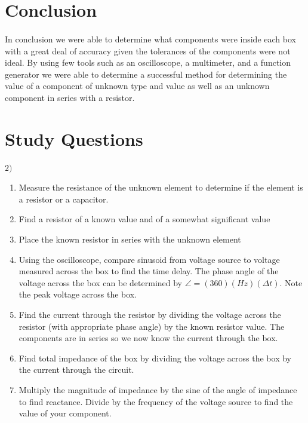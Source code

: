 \documentclass{article}
\begin{document}

\section*{Conclusion}
\paragraph{}
In conclusion we were able to determine what components were inside each box with
a great deal of accuracy given the tolerances of the components were not ideal. By
using few tools such as an oscilloscope, a multimeter, and a function generator we
were able to determine a successful method for determining the value of a component
of unknown type and value as well as an unknown component in series with a resistor.

\section*{Study Questions}

$2)$
\begin{enumerate}
\item Measure the resistance of the unknown element to determine if the element is
a resistor or a capacitor.
\item Find a resistor of a known value and of a somewhat significant value
\item Place the known resistor in series with the unknown element
\item Using the oscilloscope, compare sinusoid from voltage source to voltage measured
across the box to find the time delay. The phase angle of the voltage across the box can
be determined by $\angle{} = (360)(Hz)(\Delta{} t)$. Note the peak voltage across
the box. 
\item Find the current through the resistor by dividing the voltage across the resistor
(with appropriate phase angle) by the known resistor value. The components are in series
so we now know the current through the box.
\item Find total impedance of the box by dividing the voltage across the box by the current
through the circuit.  
\item Multiply the magnitude of impedance by the sine of the angle of impedance to find 
reactance. Divide by the frequency of the voltage source to find the value of your
component. 
\end{enumerate}
\end{document}
